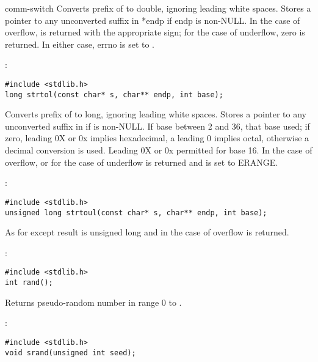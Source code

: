 \begin{Ventry2}{comm-switch  }
     Converts prefix of  to double, ignoring leading white
     spaces. Stores a pointer to any unconverted suffix in *endp if
     endp is non-NULL. In the case of overflow,  is
     returned with the appropriate sign; for the case of underflow,
     zero is returned. In either case, errno is set to .



\item[strtol]
\label{item:strtol}
:
\begin{production}
\begin{verbatim}
#include <stdlib.h>
long strtol(const char* s, char** endp, int base);
\end{verbatim}
\end{production}

     Converts prefix of  to long, ignoring leading white
     spaces. Stores a pointer to any unconverted suffix in  if
      is non-NULL. If base between 2 and 36, that base used; if
     zero, leading 0X or 0x implies hexadecimal, a leading 0 implies
     octal, otherwise a decimal conversion is used. Leading 0X or 0x
     permitted for base 16. In the case of overflow,  or
     for the case of underflow  is returned and 
     is set to ERANGE.

\item[strtoul]
\label{item:strtoul}
:
\begin{production}
\begin{verbatim}
#include <stdlib.h>
unsigned long strtoul(const char* s, char** endp, int base);
\end{verbatim}
\end{production}

     As for  except result is unsigned long and  in the case
	of overflow   is returned.

\item[rand]
\label{item:rand}
:
\begin{production}
\begin{verbatim}
#include <stdlib.h>
int rand();
\end{verbatim}
\end{production}

     Returns pseudo-random number in range 0 to .

\item[srand]
\label{item:srand}
:
\begin{production}
\begin{verbatim}
#include <stdlib.h>
void srand(unsigned int seed);
\end{verbatim}
\end{production}


\end{Ventry2}
